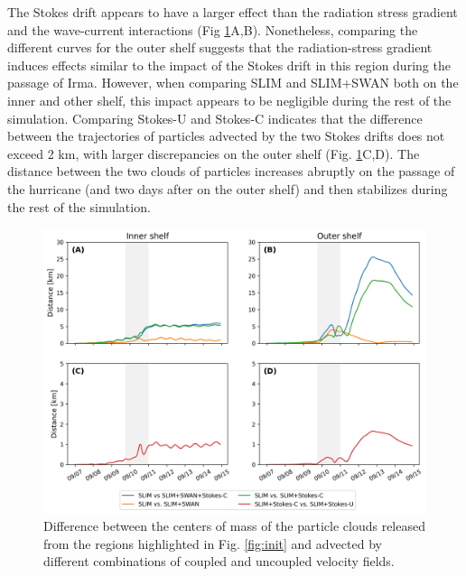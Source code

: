 \documentclass[preprint,12pt,authoryear]{elsarticle}
\begin{document}
The Stokes drift appears to have a larger effect than the radiation stress gradient and the wave-current interactions (Fig \ref{fig:traj}A,B). Nonetheless, comparing the different curves for the outer shelf suggests that the radiation-stress gradient induces effects similar to the impact of the Stokes drift in this region during the passage of Irma. However, when comparing SLIM and SLIM+SWAN both on the inner and other shelf, this impact appears to be negligible during the rest of the simulation. Comparing Stokes-U and Stokes-C indicates that the difference between the trajectories of particles advected by the two Stokes drifts does not exceed 2 km, with larger discrepancies on the outer shelf (Fig. \ref{fig:traj}C,D). The distance between the two clouds of particles increases abruptly on the passage of the hurricane (and two days after on the outer shelf) and then stabilizes during the rest of the simulation.


\begin{figure}
    \centering
    \includegraphics[width=.99\textwidth]{fig/inner_outer.png}
    \caption{Difference between the centers of mass of the particle clouds released from the regions highlighted in Fig. \ref{fig:init} and advected by different combinations of coupled and uncoupled velocity fields.}
    \label{fig:traj}
\end{figure}

\end{document}
